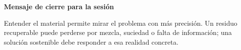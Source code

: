 ﻿\documentclass[10pt,a4paper]{article}
\begin{document}
\vspace{4mm}
\begin{tcolorbox}[
  enhanced,
  colback=AIEPNavy,
  colframe=AIEPNavy,
  boxrule=0pt,
  arc=1mm,
  left=4mm,
  right=4mm,
  top=3.5mm,
  bottom=3.5mm
]
{\color{White}\bfseries Mensaje de cierre para la sesión}\par\vspace{1mm}
{\color{AIEPSoftBlue}Entender el material permite mirar el problema con más precisión. Un residuo recuperable puede perderse por mezcla, suciedad o falta de información; una solución sostenible debe responder a esa realidad concreta.}
\end{tcolorbox}
\end{document}

